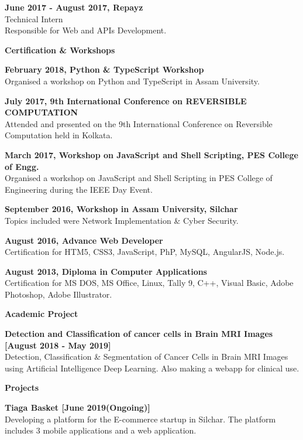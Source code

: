 \documentclass[a4paper,11pt,final]{memoir}
\newcommand{\SmallSep}{\vspace{0.5em}}
\newcommand{\CVSection}[1]
	{\Large\textbf{#1}\par
	\SmallSep\normalsize\normalfont}
\newcommand{\CVItem}[1]
	{\textbf{\color{RoyalBlue} #1}}
\begin{document}
\CVItem{June 2017 - August 2017, Repayz}\\
Technical Intern\\
Responsible for Web and APIs Development.

\SmallSep

\CVSection{Certification \& Workshops}

\CVItem{February 2018,  Python \& TypeScript Workshop }\\
Organised a workshop on Python and TypeScript in Assam University.
\SmallSep

\CVItem{July 2017, 9th International Conference on REVERSIBLE COMPUTATION }\\
Attended and presented on the 9th International Conference on Reversible Computation held in Kolkata.
\SmallSep

\CVItem{March 2017, Workshop on JavaScript and Shell Scripting, PES College of Engg.}\\
Organised a workshop on JavaScript and Shell Scripting in PES College of Engineering during the IEEE Day Event.
\SmallSep

\CVItem{September 2016, Workshop in Assam University, Silchar}\\
Topics included were Network Implementation & Cyber Security.
\SmallSep

\CVItem{August 2016, Advance Web Developer}\\
Certification for HTM5, CSS3, JavaScript, PhP, MySQL, AngularJS, Node.js.
\SmallSep

\CVItem{August 2013, Diploma in Computer Applications}\\
Certification for MS DOS, MS Office, Linux, Tally 9, C++, Visual Basic, Adobe Photoshop, Adobe Illustrator.
\SmallSep

\CVSection{Academic Project}
\CVItem{Detection and Classification of cancer cells in Brain MRI Images [August 2018 - May 2019]}\\
Detection, Classification \& Segmentation of Cancer Cells in Brain MRI Images using Artificial Intelligence Deep Learning. Also making  a webapp for clinical use.
\SmallSep

\clearpage
\framebreak
\framebreak

\CVSection{Projects}

\CVItem{Tiaga Basket [June 2019(Ongoing)]}\\
Developing a platform for the E-commerce startup in Silchar. The platform includes 3 mobile applications and a web application.
\SmallSep
\end{document}
